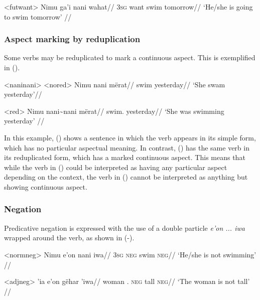 \documentclass[../hewa_main-subfiles.tex]{subfiles}
\begin{document}
\ex<futwant>
\begingl %
\gla Nimu ga'i nani wahat//
\glb \textsc{3sg} want swim tomorrow//
\glft `He/she is going to swim tomorrow' // 
\endgl
\xe

\subsubsection{Aspect marking by reduplication}

Some verbs may be reduplicated to mark a continuous aspect. This is exemplified in ().

\pex<naninani> %
\a<nored> %
\begingl %
\gla Nimu nani mërat//
\glb \Third{}\Sg{} swim yesterday//
\glft `She swam yesterday'// 
\endgl

\a<red> %
\begingl %
\gla Nimu nani\textasciitilde nani mërat//
\glb \Third{}\Sg{} swim.\Rdp{} yesterday//
\glft `She was swimming yesterday' // 
\endgl
\xe

In this example, () shows a sentence in which the verb appears in its simple form, which has no particular aspectual meaning. In contrast, () has the same verb in its reduplicated form, which has a marked continuous aspect. This means that while the verb in () could be interpreted as having any particular aspect depending on the context, the verb in () cannot be interpreted as anything but showing continuous aspect.



\subsubsection{Negation}\label{sec:neg}

Predicative negation is expressed with the use of a double particle \textit{e'on ... iwa} wrapped around the verb, as shown in (-).

\ex<normneg>
\begingl %
\gla Nimu e'on nani iwa//
\glb \textsc{3sg} \textsc{neg} swim \textsc{neg}//
\glft `He/she is not swimming' // 
\endgl
\xe

\ex<adjneg>
\begingl %
 'ia e'on gëhar 'iwa//
\glb woman \Def{}.\Sg{} \textsc{neg} tall \textsc{neg}//
\glft `The woman is not tall' // 
\endgl
\xe
\end{document}
